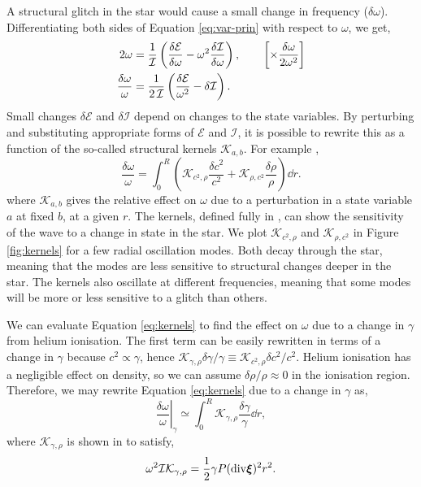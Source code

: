 A structural glitch in the star would cause a small change in frequency (\(\delta\omega\)). Differentiating both sides of Equation \ref{eq:var-prin} with respect to \(\omega\), we get,
%
\begin{align}
    2\omega &= \frac{1}{\mathcal{I}} \left( \frac{\delta\mathcal{E}}{\delta\omega} - \omega^2 \frac{\delta\mathcal{I}}{\delta\omega}\right), \qquad \left[\times \frac{\delta\omega}{2\omega^2}\right] \notag \\
    \frac{\delta\omega}{\omega} &= \frac{1}{2\,\mathcal{I}} \left(\frac{\delta\mathcal{E}}{\omega^2} - \delta\mathcal{I}\right).
\end{align}
%
Small changes \(\delta\mathcal{E}\) and \(\delta\mathcal{I}\) depend on changes to the state variables. By perturbing and substituting appropriate forms of \(\mathcal{E}\) and \(\mathcal{I}\), it is possible to rewrite this as a function of the so-called structural kernels \(\mathcal{K}_{a,b}\). For example \citep{Christensen-Dalsgaard2014},
%
\begin{equation}
    \frac{\delta\omega}{\omega} = \int_0^R \left(\mathcal{K}_{c^2,\rho} \frac{\delta c^2}{c^2} + \mathcal{K}_{\rho,c^2} \frac{\delta \rho}{\rho} \right) \dd r.\label{eq:kernels}
\end{equation}
%
where \(\mathcal{K}_{a, b}\) gives the relative effect on \(\omega\) due to a perturbation in a state variable \(a\) at fixed \(b\), at a given \(r\). The kernels, defined fully in \citet{Gough.Thompson1991}, can show the sensitivity of the wave to a change in state in the star. We plot \(\mathcal{K}_{c^2,\rho}\) and \(\mathcal{K}_{\rho,c^2}\) in Figure \ref{fig:kernels} for a few radial oscillation modes. Both decay through the star, meaning that the modes are less sensitive to structural changes deeper in the star. The kernels also oscillate at different frequencies, meaning that some modes will be more or less sensitive to a glitch than others.

We can evaluate Equation \ref{eq:kernels} to find the effect on \(\omega\) due to a change in \(\gamma\) from helium ionisation. The first term can be easily rewritten in terms of a change in \(\gamma\) because \(c^2 \propto \gamma\), hence \(\mathcal{K}_{\gamma,\rho} \delta \gamma / \gamma \equiv \mathcal{K}_{c^2,\rho} \delta c^2 / c^2\). Helium ionisation has a negligible effect on density, so we can assume \(\delta\rho/\rho \approx 0\) in the ionisation region. Therefore, we may rewrite Equation \ref{eq:kernels} due to a change in \(\gamma\) as,
%
\begin{equation}
    \left.\frac{\delta\omega}{\omega}\right|_\gamma \simeq \int_0^R \mathcal{K}_{\gamma,\rho} \frac{\delta\gamma}{\gamma} \dd r,\label{eq:delta-omega}
\end{equation}
%
where \(\mathcal{K}_{\gamma,\rho}\) is shown in \citet{Gough1993} to satisfy,
%
\begin{equation}
    \omega^2 \mathcal{I}\mathcal{K}_{\gamma,\rho} = \frac12 \gamma P (\mathrm{div} \bm{\xi})^2 r^2.\label{eq:gamma-kernel}
\end{equation}
%

